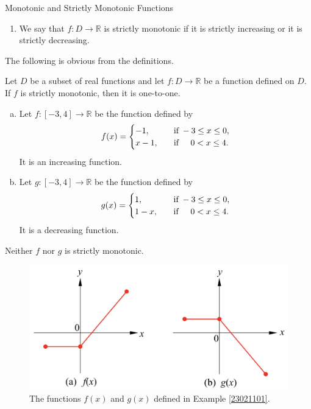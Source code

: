 \begin{example}
\begin{definition}{Monotonic    and Strictly Monotonic Functions}
\begin{enumerate}[1.]
 
\item We say that $f:D\to\mathbb{R}$ is strictly monotonic if it is strictly increasing or it is strictly decreasing.
\end{enumerate}
\end{definition}
The following is obvious from the definitions.
\begin{proposition}{}
Let $D$ be a subset of real functions and let $f:D\rightarrow\mathbb{R}$ be a function defined on $D$. If $f$ is strictly monotonic, then it is one-to-one.
\end{proposition}
\begin{example}[label=23021101]{}\begin{enumerate}[(a)]
\item
Let $f:[-3,4]\rightarrow\mathbb{R}$  be the function defined by 
\[f(x)=\begin{cases} -1,\quad &\text{if}\;-3\leq x\leq 0,\\
x-1,\quad &\text{if}\hspace{0.5cm}0<x\leq 4.\end{cases}\]It is an increasing function.
\item Let   $g:[-3,4]\rightarrow\mathbb{R}$ be the function defined by 
\[g(x)=\begin{cases} 1,\quad &\text{if}\;-3\leq x\leq 0,\\
1-x,\quad &\text{if}\hspace{0.5cm}0< x\leq 4.\end{cases}\]It is a decreasing function. 
 \end{enumerate} Neither $f$ nor $g$ is strictly monotonic.
\end{example}

\begin{figure}[ht]
\centering
\includegraphics[scale=0.2]{Picture13.png}
\caption{  The functions $f(x)$ and $g(x)$ defined in Example \ref{23021101}.}\label{figure13}
\end{figure}


\end{example}

